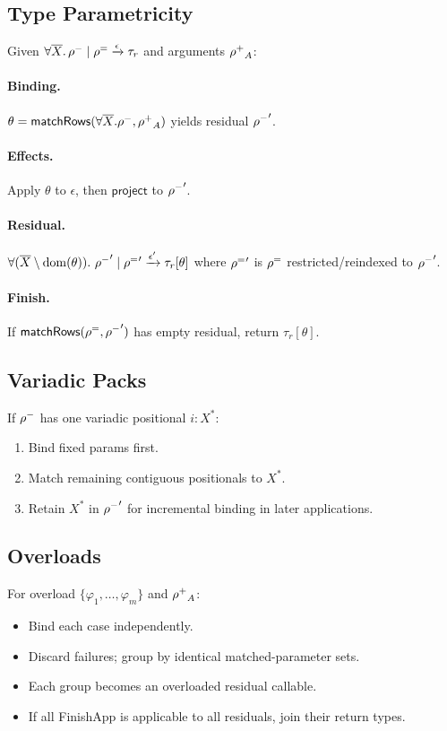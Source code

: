 \subsection{Type Parametricity}
Given $\forall\overline{X}.\,\mathord{\rho^{-}} \mid \mathord{\rho^{=}} \xrightarrow{\epsilon} \tau_r$ and arguments $\mathord{\rho^{+}}_A$:

\paragraph{Binding.}
$\theta = \mathsf{matchRows}(\forall\overline{X}.\mathord{\rho^{-}},\mathord{\rho^{+}}_A)$ yields residual $\mathord{\rho^{-}}'$.

\paragraph{Effects.}
Apply $\theta$ to $\epsilon$, then $\mathsf{project}$ to $\mathord{\rho^{-}}'$.

\paragraph{Residual.} $\forall(\overline{X} \setminus \mathrm{dom}(\theta)).~\mathord{\rho^{-}}' \mid \mathord{\rho^{=}}' \xrightarrow{\epsilon'} \tau_r[\theta]$
where $\mathord{\rho^{=}}'$ is $\mathord{\rho^{=}}$ restricted/reindexed to $\mathord{\rho^{-}}'$.

\paragraph{Finish.}
If $\mathsf{matchRows}(\mathord{\rho^{=}},\mathord{\rho^{-}}')$ has empty residual, return $\tau_r[\theta]$.

\subsection{Variadic Packs}
If $\mathord{\rho^{-}}$ has one variadic positional $i:X^*$:
\begin{enumerate}
  \item Bind fixed params first.
  \item Match remaining contiguous positionals to $X^*$.
  \item Retain $X^*$ in $\mathord{\rho^{-}}'$ for incremental binding in later applications.
\end{enumerate}

\subsection{Overloads}
For overload $\{\varphi_1,\dots,\varphi_m\}$ and $\mathord{\rho^{+}}_A$:
\begin{itemize}
  \item Bind each case independently.
  \item Discard failures; group by identical matched-parameter sets.
  \item Each group becomes an overloaded residual callable.
  \item If all \textsf{FinishApp} is applicable to all residuals, join their return types.
\end{itemize}

